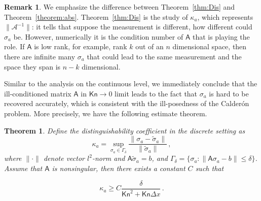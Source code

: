 \documentclass[english,reqno]{amsart}
\theoremstyle{plain}
\newtheorem{theorem}{Theorem}
\theoremstyle{definition} %
\newtheorem{remark}{Remark}
\newcommand{\Amat}{\mathsf{A}}
\newcommand{\Kn}{\mathsf{Kn}}
\begin{document}
\begin{remark}
We emphasize the difference between Theorem~\ref{thm:Dis} and Theorem~\ref{theorem:abs}. Theorem~\ref{thm:Dis} is the study of $\kappa_a$, which represents $\|\mathcal{A}^{-1}\|$: it tells that suppose the measurement is different, how different could $\sigma_a$ be. However, numerically it is the condition number of $\Amat$ that is playing the role. If $\Amat$ is low rank, for example, rank $k$ out of an $n$ dimensional space, then there are infinite many $\sigma_a$ that could lead to the same measurement and the space they span is $n-k$ dimensional.
\end{remark}

Similar to the analysis on the continuous level, we immediately conclude that the ill-conditioned matrix $\Amat$ in $\Kn\to0$ limit leads to the fact that $\sigma_a$ is hard to be recovered accurately, which is consistent with the ill-posedness of the Calder\'on problem. More precisely, we have the following estimate theorem. 

\begin{theorem}
Define the distinguishability coefficient in the discrete setting as
\begin{equation*}
\kappa_a = \sup_{\sigma_a \in \Gamma_\delta} \frac{\| \sigma_a - \tilde{\sigma}_a \|}{ \|\tilde{\sigma}_a \|}\,,
\end{equation*}
where $\|\cdot\|$ denote vector $l^2$-norm and $\Amat \tilde{\sigma}_a = b$, and $\Gamma_\delta = \{ \sigma_a: \| \Amat \sigma_a - b \| \leq \delta \}$. Assume that $\Amat$ is nonsingular, then there exists a constant $C$ such that

\begin{equation} \label{eqn:222}
 \kappa_a \geq  C \frac{\delta}{ \Kn^2 + \Kn \Delta x}\,.
 \end{equation}
 
 \end{theorem}
\end{document}
